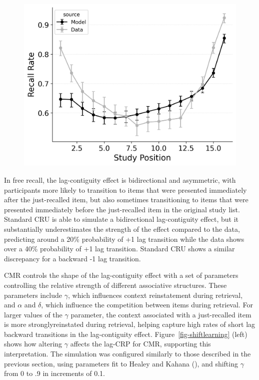 \documentclass[
  man,
  floatsintext,
  longtable,
  nolmodern,
  notxfonts,
  notimes,
  draftfirst,
  colorlinks=true,linkcolor=blue,citecolor=blue,urlcolor=blue]{apa7}
\begin{document}
\begin{figure}
\begin{minipage}{0.33\linewidth}
\includegraphics{figures/bw_HealeyKahana2014_CRU_with_Feature-to-Context__Pre-Expt__Primacy__and_StartDrift_Fitting_spc.png}\end{minipage}%

\end{figure}%

In free recall, the lag-contiguity effect is bidirectional and
asymmetric, with participants more likely to transition to items that
were presented immediately after the just-recalled item, but also
sometimes transitioning to items that were presented immediately before
the just-recalled item in the original study list. Standard CRU is able
to simulate a bidirectional lag-contiguity effect, but it substantially
underestimates the strength of the effect compared to the data,
predicting around a 20\% probability of +1 lag transition while the data
shows over a 40\% probability of +1 lag transition. Standard CRU shows a
similar discrepancy for a backward -1 lag transition.

CMR controls the shape of the lag-contiguity effect with a set of
parameters controlling the relative strength of different associative
structures. These parameters include \(\gamma\), which influences
context reinstatement during retrieval, and \(\alpha\) and \(\delta\),
which influence the competition between items during retrieval. For
larger values of the \(\gamma\) parameter, the context associated with a
just-recalled item is more stronglyreinstated during retrieval, helping
capture high rates of short lag backward transitions in the
lag-contiguity effect. Figure~\ref{fig-shiftlearning} (left) shows how
altering \(\gamma\) affects the lag-CRP for CMR, supporting this
interpretation. The simulation was configured similarly to those
described in the previous section, using parameters fit to Healey and
Kahana (), and shifting \(\gamma\)
from 0 to .9 in increments of 0.1.
\end{document}
